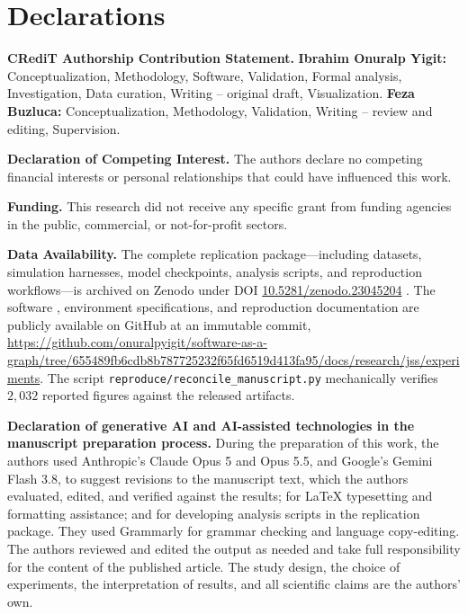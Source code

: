 \documentclass[preprint,3p]{elsarticle}
\newcommand{\sagexperimentsurl}{https://github.com/onuralpyigit/software-as-a-graph/tree/655489fb6cdb8b787725232f65fd6519d413fa95/docs/research/jss/experiments}
\newcommand{\sagexperiments}{\url{\sagexperimentsurl}}
\begin{document}
{\small
\section*{Declarations}

\noindent\textbf{CRediT Authorship Contribution Statement.} \textbf{Ibrahim Onuralp Yigit:} Conceptualization, Methodology, Software, Validation, Formal analysis, Investigation, Data curation, Writing -- original draft, Visualization. \textbf{Feza Buzluca:} Conceptualization, Methodology, Validation, Writing -- review and editing, Supervision.

\noindent\textbf{Declaration of Competing Interest.} The authors declare no competing financial interests or personal relationships that could have influenced this work.

\noindent\textbf{Funding.} This research did not receive any specific grant from funding agencies in the public, commercial, or not-for-profit sectors.

\noindent\textbf{Data Availability.} The complete replication package---including datasets, simulation harnesses, model checkpoints, analysis scripts, and reproduction workflows---is archived on Zenodo under DOI \href{https://doi.org/10.5281/zenodo.23045204}{10.5281/zenodo.23045204} \cite{sag-replication-package}. The software \cite{sag-software}, environment specifications, and reproduction documentation are publicly available on GitHub at an immutable commit, \sagexperiments. The script \texttt{reproduce/reconcile\_manuscript.py} mechanically verifies $2{,}032$ reported figures against the released artifacts.

\noindent\textbf{Declaration of generative AI and AI-assisted technologies in the manuscript preparation process.} During the preparation of this work, the authors used Anthropic's Claude Opus 5 and Opus 5.5, and Google's Gemini Flash 3.8, to suggest revisions to the manuscript text, which the authors evaluated, edited, and verified against the results; for LaTeX typesetting and formatting assistance; and for developing analysis scripts in the replication package. They used Grammarly for grammar checking and language copy-editing. The authors reviewed and edited the output as needed and take full responsibility for the content of the published article. The study design, the choice of experiments, the interpretation of results, and all scientific claims are the authors' own.

}


\renewcommand{\bibfont}{\footnotesize\linespread{0.85}\selectfont}
\setlength{\bibsep}{0pt}


\end{document}
